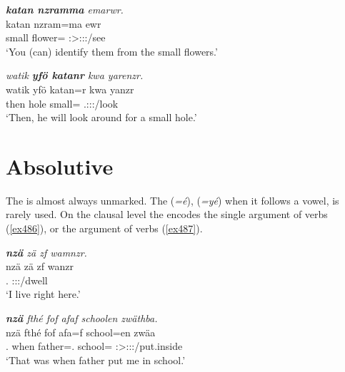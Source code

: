 \begin{exe}
	\ex \emph{\textbf{katan nzramma} emarwr.}\\
	\gll katan nzram=ma ewr\\
	small flower={\Char} \Stsg:\Sbj>\Stpl:\Obj:\Nonpast:\Ipfv/see\\
	\trans `You (can) identify them from the small flowers.'
	\label{ex485}
\end{exe}
\begin{exe}
	\ex \emph{watik \textbf{yfö katanr} kwa yarenzr.}\\
	\gll watik yfö katan=r kwa yanzr\\
	then hole small={\Purp} {\Fut} \Tsg.\Masc:\Sbj:\Nonpast:\Ipfv/look\\
	\trans `Then, he will look around for a small hole.'
	\label{ex484}
\end{exe}

\section{Absolutive}\label{abscase}

The   is almost always unmarked. The   (\emph{=é}), (\emph{=yé}) when it follows a vowel, is rarely used. On the clausal level the  encodes the single argument of  verbs (\ref{ex486}), or the  argument of  verbs (\ref{ex487}).

\begin{exe}
	\ex \emph{\textbf{nzä} zä zf wamnzr.}\\
	\gll nzä zä zf wanzr\\
	\Fsg.{\Abs} {\Prox} {\Imm} \Fsg:\Sbj:\Nonpast:\Ipfv/dwell\\
	\trans `I live right here.'
	\label{ex486}
\end{exe}
\begin{exe}
	\ex \emph{\textbf{nzä} fthé fof afaf schoolen zwäthba.}\\
	\gll nzä fthé fof afa=f school=en zwäa\\
	\Fsg.{\Abs} when {\Emph} father=\Erg.{\Sg} school={\Loc} \Stsg:\Sbj>\Fsg:\Obj:\Pst:\Pfv/put.inside\\
	\trans `That was when father put me in school.'
	\label{ex487}
\end{exe}
	
